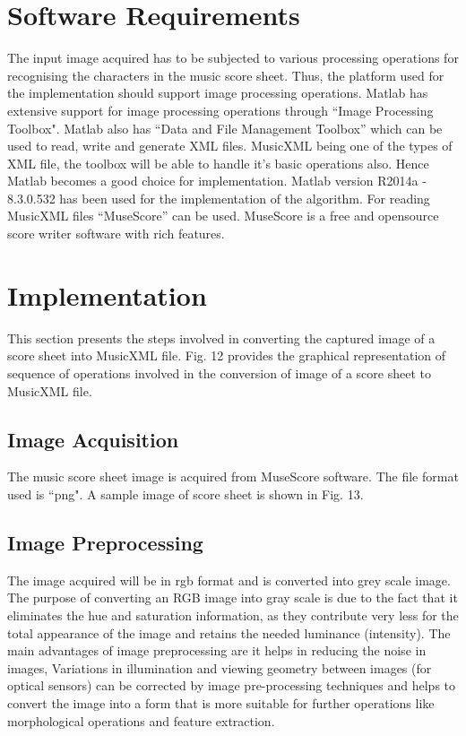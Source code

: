 \documentclass[journal]{IEEEtran}
\begin{document}
\section{Software Requirements}
 The input image acquired has to be subjected to various processing operations for recognising the characters in the music score sheet. Thus, the platform used for the implementation  should support
image processing operations. Matlab has extensive support for image processing operations through “Image Processing Toolbox". Matlab also has “Data and File Management Toolbox” which can be used to read, write and generate XML files. MusicXML being one of the types of XML file, the toolbox will be able to handle it's basic operations also. Hence Matlab becomes a good choice for implementation. Matlab version R2014a - 8.3.0.532 has been used for the implementation of the algorithm. For reading MusicXML files “MuseScore” can be used. MuseScore is a free and opensource score writer software with rich features.

\section{Implementation}
This section presents the steps involved in converting the captured image of a score sheet into MusicXML file. Fig. 12 provides the graphical representation of sequence of operations involved in the conversion of image of a score sheet to MusicXML file.


\subsection{Image Acquisition}
 The music score sheet image is acquired from MuseScore software. The file format used is ``png". A sample image of score sheet is shown in Fig. 13.
 
 
 \subsection{Image Preprocessing}
  The image acquired will be in rgb format and is converted into grey scale image. The purpose of converting an RGB image into gray scale is due to the fact that it eliminates the hue and saturation information, as they contribute very less for the total appearance of the image and retains the needed luminance (intensity).  The main advantages of image preprocessing are it helps in reducing the noise in images, Variations in illumination and viewing geometry between images (for optical sensors) can be corrected by image pre-processing techniques and helps to convert the image into a form that is more suitable for further
operations like morphological operations and feature extraction.
\end{document}
